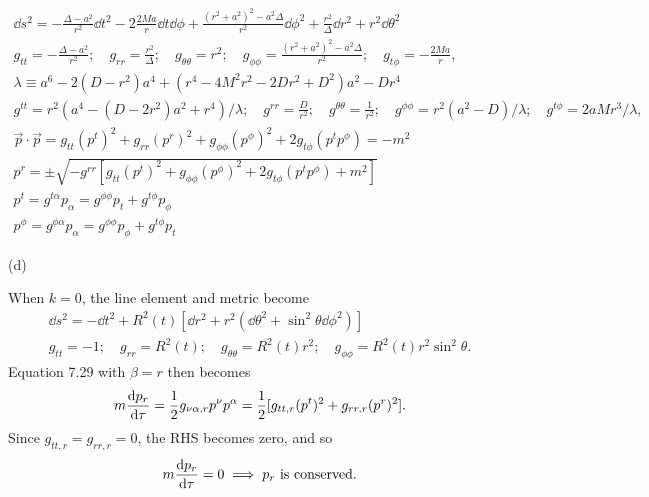 \documentclass[gr-notes.tex]{subfiles}
\begin{document}
\begin{gather*}
  \dd{s}^2 =
 -\frac{\Delta - a^2}{r^2} \dd{t}^2 -
  2 \frac{2 M a}{r} \dd{t} \dd\phi +
  \frac{(r^2 + a^2)^2 - a^2 \Delta}{r^2} \dd\phi^2 +
  \frac{r^2}{\Delta} \dd{r}^2 +
  r^2 \dd\theta^2
  \\
  g_{tt} = -\frac{\Delta - a^2}{r^2};
  \quad
  g_{rr} = \frac{r^2}{\Delta};
  \quad
  g_{\theta\theta} = r^2;
  \quad
  g_{\phi\phi} = \frac{(r^2 + a^2)^2 - a^2 \Delta}{r^2};
  \quad
  g_{t\phi} = -\frac{2 M a}{r},
  \\
  \lambda \equiv
  a^6 - 2 (D - r^2) a^4 + (r^4 - 4 M^2 r^2 - 2 D r^2 + D^2) a^2 - D r^4
  \\
  g^{tt} = r^2 (a^4 - (D - 2 r^2) a^2 + r^4) / \lambda;
  \quad
  g^{rr} = \frac{D}{r^2};
  \quad
  g^{\theta\theta} = \frac{1}{r^2};
  \quad
  g^{\phi\phi} = r^2 (a^2 - D) / \lambda;
  \quad
  g^{t\phi} = 2 a M r^3 / \lambda,
  \\
  \vec{p} \cdot \vec{p} =
  g_{tt} (p^t)^2 +
  g_{rr} (p^r)^2 +
  g_{\phi\phi} (p^\phi)^2 +
  2 g_{t\phi} (p^t p^\phi) =
 -m^2
  \\
  p^r =
  \pm\sqrt{
   -g^{rr}
    [g_{tt} (p^t)^2 +
     g_{\phi\phi} (p^\phi)^2 +
     2 g_{t\phi} (p^t p^\phi) +
     m^2]
  }
  \\
  p^t =
  g^{t\alpha} p_\alpha =
  g^{\phi\phi} p_t + g^{t\phi} p_\phi
  \\
  p^\phi =
  g^{\phi\alpha} p_\alpha =
  g^{\phi\phi} p_\phi + g^{t\phi} p_t
\end{gather*}

(d)

When $k = 0$, the line element and metric become
%
\begin{gather*}
  \dd{s}^2 =
 -\dd{t}^2 +
  R^2(t) [ \dd{r}^2 + r^2 (\dd\theta^2 + \sin^2\theta \dd\phi^2) ]
  \\
  g_{tt} = -1;
  \quad
  g_{rr} = R^2(t);
  \quad
  g_{\theta\theta} = R^2(t) r^2;
  \quad
  g_{\phi\phi} = R^2(t) r^2 \sin^2\theta.
\end{gather*}
%
Equation 7.29 with $\beta = r$ then becomes
%
\begin{displaymath}
  m \dv{p_r}{\tau} =
  \frac{1}{2} g_{\nu\alpha,r} p^\nu p^\alpha =
  \frac{1}{2} [ g_{tt,r} (p^t)^2 + g_{rr,r} (p^r)^2 ].
\end{displaymath}
%
Since $g_{tt,r} = g_{rr,r} = 0$, the RHS becomes zero, and so
%
\begin{displaymath}
  m \dv{p_r}{\tau} =
  0 \implies
  \text{$p_r$ is conserved}.
\end{displaymath}
\end{document}

